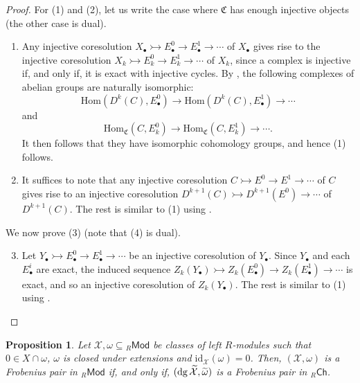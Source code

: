 \documentclass[10pt,reqno]{amsart}
\numberwithin{equation}{section}
\newtheorem{proposition}[definition]{Proposition}
\theoremstyle{remark}
\newcommand{\Hom}{\mathrm{Hom}}
\newcommand{\C}{\mathfrak{C}}
\newcommand{\X}{\mathcal{X}}
\newcommand{\id}{\mathrm{id}}
\begin{document}
\begin{proof}
For (1) and (2), let us write the case where $\mathfrak{C}$ has enough injective objects (the other case is dual). 
\begin{enumerate}[(1)]
\item Any injective coresolution $X_\bullet \rightarrowtail E^0_\bullet \to E^1_\bullet \to \cdots$ of $X_\bullet$ gives rise to the injective coresolution $X_k \rightarrowtail E^0_k \to E^1_k \to \cdots$ of $X_k$, since a complex is injective if, and only if, it is exact with injective cycles. By \cite[Lem. 3.1 (1)]{GillespieFlat}, the following complexes of abelian groups are naturally isomorphic:
\[
\Hom(D^k(C),E^0_\bullet) \to \Hom(D^k(C),E^1_\bullet) \to \cdots
\]
and
\[
\Hom_{\C}(C,E^0_k) \to \Hom_{\C}(C,E^1_k) \to \cdots.
\]
It then follows that they have isomorphic cohomology groups, and hence (1) follows.

\item It suffices to note that any injective coresolution $C \rightarrowtail E^0 \to E^1 \to \cdots$ of $C$ gives rise to an injective coresolution $D^{k+1}(C) \rightarrowtail D^{k+1}(E^0) \to \cdots$ of $D^{k+1}(C)$. The rest is similar to (1) using \cite[Lem. 3.1 (2)]{GillespieFlat}.
\end{enumerate}
We now prove (3) (note that (4) is dual). 
\begin{enumerate}[(1)]
\setcounter{enumi}{2}
\item Let $Y_\bullet \rightarrowtail E^0_\bullet \to E^1_\bullet \to \cdots$ be an injective coresolution of $Y_\bullet$. Since $Y_\bullet$ and each $E^i_\bullet$ are exact, the induced sequence $Z_k(Y_\bullet) \rightarrowtail Z_k(E^0_\bullet) \to Z_k(E^1_\bullet) \to \cdots$ is exact, and so an injective coresolution of $Z_k(Y_\bullet)$. The rest is similar to (1) using \cite[Lem. 3.1 (3)]{GillespieFlat}.
\end{enumerate}
\end{proof}


\begin{proposition}
Let $\X, \omega \subseteq {}_R\mathsf{Mod}$ be classes of left $R$-modules such that $0 \in X \cap \omega$, $\omega$ is closed under extensions and $\id_{\X}(\omega) = 0$. Then, $(\X, \omega)$ is a Frobenius pair in ${}_R\mathsf{Mod}$ if, and only if, $({\rm dg}\,\widetilde{\X}, \widetilde{\omega})$ is a Frobenius pair in ${}_R\mathsf{Ch}$. \\
\end{proposition}
 
\end{document}

